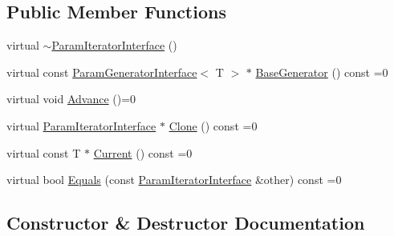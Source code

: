 \subsection*{Public Member Functions}
\begin{DoxyCompactItemize}
\item 
virtual \hyperlink{classtesting_1_1internal_1_1ParamIteratorInterface_adf6ba49e6b54a6e3b15dbd5733988bef}{$\sim$\+Param\+Iterator\+Interface} ()
\item 
virtual const \hyperlink{classtesting_1_1internal_1_1ParamGeneratorInterface}{Param\+Generator\+Interface}$<$ T $>$ $\ast$ \hyperlink{classtesting_1_1internal_1_1ParamIteratorInterface_a17500953df75ecda1ace46c08ff731e9}{Base\+Generator} () const =0
\item 
virtual void \hyperlink{classtesting_1_1internal_1_1ParamIteratorInterface_a600dbd35fcb551463e379516a1abea48}{Advance} ()=0
\item 
virtual \hyperlink{classtesting_1_1internal_1_1ParamIteratorInterface}{Param\+Iterator\+Interface} $\ast$ \hyperlink{classtesting_1_1internal_1_1ParamIteratorInterface_a4998c23e27e2943d97546011aa35db80}{Clone} () const =0
\item 
virtual const T $\ast$ \hyperlink{classtesting_1_1internal_1_1ParamIteratorInterface_adfff808576d929085679c315b255af7e}{Current} () const =0
\item 
virtual bool \hyperlink{classtesting_1_1internal_1_1ParamIteratorInterface_a9d811697a752d46f7bd6a0082f9040a3}{Equals} (const \hyperlink{classtesting_1_1internal_1_1ParamIteratorInterface}{Param\+Iterator\+Interface} \&other) const =0
\end{DoxyCompactItemize}


\subsection{Constructor \& Destructor Documentation}
\mbox{\label{classtesting_1_1internal_1_1ParamIteratorInterface_adf6ba49e6b54a6e3b15dbd5733988bef}} 
